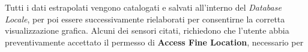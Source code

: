 \documentclass{article}
\begin{document}
    \begin{center}
        \begin{figure}[H]
            \centering
        \end{figure}
    \end{center}
    Tutti i dati estrapolati vengono catalogati e salvati all'interno del \textit{Database Locale}, per poi essere successivamente rielaborati per consentirne la corretta
    visualizzazione grafica. Alcuni dei sensori citati, richiedono che l'utente abbia preventivamente accettato il permesso di \textbf{Access Fine Location}, necessario per
\end{document}
